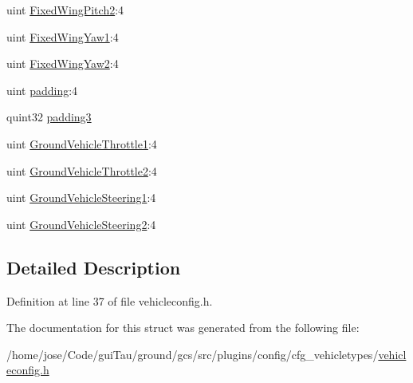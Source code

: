 \begin{DoxyCompactItemize}
uint \hyperlink{group___config_plugin_gaeef8404a3e1d41f57ce18b8e9b351a2d}{Fixed\-Wing\-Pitch2}\-:4
\item 
uint \hyperlink{group___config_plugin_ga8282dac2550d491034ca0e0fa8f09c0d}{Fixed\-Wing\-Yaw1}\-:4
\item 
uint \hyperlink{group___config_plugin_ga0f87bb28c2fe43ab7616b7322ac21106}{Fixed\-Wing\-Yaw2}\-:4
\item 
uint \hyperlink{group___config_plugin_gae439ab85c005f3400498997049fd50e8}{padding}\-:4
\item 
quint32 \hyperlink{group___config_plugin_gae95d6e80e1c87598f33d4be1b0a8c410}{padding3}
\item 
uint \hyperlink{group___config_plugin_ga755435654b7373fe879e991ccdd40757}{Ground\-Vehicle\-Throttle1}\-:4
\item 
uint \hyperlink{group___config_plugin_ga6a8ae4214756c689b83b9f42a56c2505}{Ground\-Vehicle\-Throttle2}\-:4
\item 
uint \hyperlink{group___config_plugin_gad4fe3d4d30764b30210253be62bb0974}{Ground\-Vehicle\-Steering1}\-:4
\item 
uint \hyperlink{group___config_plugin_gab404016de72261d048356e628b9ef0b7}{Ground\-Vehicle\-Steering2}\-:4
\end{DoxyCompactItemize}


\subsection{Detailed Description}


Definition at line 37 of file vehicleconfig.\-h.



The documentation for this struct was generated from the following file\-:\begin{DoxyCompactItemize}
\item 
/home/jose/\-Code/gui\-Tau/ground/gcs/src/plugins/config/cfg\-\_\-vehicletypes/\hyperlink{vehicleconfig_8h}{vehicleconfig.\-h}\end{DoxyCompactItemize}
